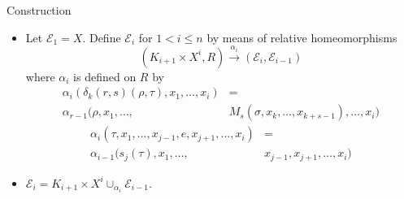 \documentclass{beamer}
\theoremstyle{definition}
\begin{document}
\begin{frame}
\begin{block}{Construction}
\begin{itemize}
\item Let $\mathcal{E}_1=X$. Define $\mathcal{E}_i$ for $1<i\leq n$ by means of relative homeomorphisms %
\[
(K_{i+1}\times X^i,R)\xrightarrow{\alpha_i} (\mathcal{E}_i,\mathcal{E}_{i-1})
\]
where $\alpha_i$ is defined on $R$ by %
\begin{align*}
\alpha_i(\delta_k(r,s)(\rho,\tau),x_1,\dots,x_i)&=\\
\alpha_{r-1}(\rho,x_1,\dots,&M_s(\sigma,x_k,\dots, x_{k+s-1}),\dots, x_i)
\end{align*}
\begin{align*}
\alpha_i(\tau,x_1,\dots,x_{j-1},e,x_{j+1},\dots, x_i)&=\\
\alpha_{i-1}(s_j(\tau),x_1,\dots,& x_{j-1},x_{j+1},\dots, x_i)
\end{align*}
\item<2->$\mathcal{E}_i=K_{i+1}\times X^i\cup_{\alpha_i}\mathcal{E}_{i-1}$.%
\end{itemize}
\end{block}
\end{frame}
\end{document}
